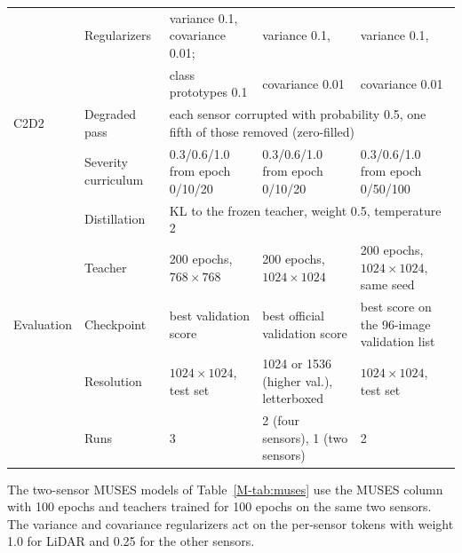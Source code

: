 \documentclass[10pt]{article}
\newcommand{\tabnotewide}[1]{\par\vspace{3pt}\parbox{\textwidth}{\raggedright\scriptsize #1}}
\begin{document}
\begin{table}[!htbp]
\begin{tabular*}{\textwidth}{@{\extracolsep{\fill}}lllll@{}}
 & Regularizers & variance 0.1, covariance 0.01; & variance 0.1, & variance 0.1, \\
 & & class prototypes 0.1 & covariance 0.01 & covariance 0.01 \\
\midrule
C2D2 & Degraded pass & \multicolumn{3}{l}{each sensor corrupted with probability 0.5, one fifth of those removed (zero-filled)} \\
 & Severity curriculum & 0.3/0.6/1.0 from epoch 0/10/20 & 0.3/0.6/1.0 from epoch 0/10/20 & 0.3/0.6/1.0 from epoch 0/50/100 \\
 & Distillation & \multicolumn{3}{l}{KL to the frozen teacher, weight 0.5, temperature 2} \\
 & Teacher & 200 epochs, $768\times768$ & 200 epochs, $1024\times1024$ & 200 epochs, $1024\times1024$, same seed \\
\midrule
Evaluation & Checkpoint & best validation score & best official validation score & best score on the 96-image validation list \\
 & Resolution & $1024\times1024$, test set & 1024 or 1536 (higher val.), letterboxed & $1024\times1024$, test set \\
 & Runs & 3 & 2 (four sensors), 1 (two sensors) & 2 \\
\bottomrule
\end{tabular*}
\tabnotewide{The two-sensor MUSES models of Table~\ref{M-tab:muses} use the MUSES column with 100 epochs and teachers trained for 100 epochs on the same two sensors. The variance and covariance regularizers act on the per-sensor tokens with weight 1.0 for LiDAR and 0.25 for the other sensors.}
\end{table}
\end{document}
